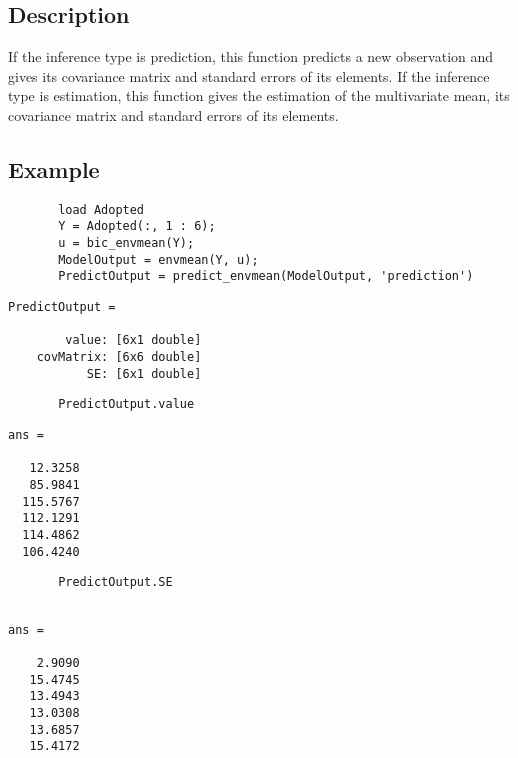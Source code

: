 \documentclass[a4paper,11pt,openany]{memoir}
\begin{document}
\subsection*{Description}

\begin{par}
If the inference type is prediction, this function predicts a new observation and gives its covariance matrix and standard errors of its elements.  If the inference type is estimation, this function gives the estimation of the multivariate mean, its covariance matrix and standard errors of its elements.
\end{par} \vspace{1em}



\subsection*{Example}


\begin{verbatim}       load Adopted
       Y = Adopted(:, 1 : 6);
       u = bic_envmean(Y);
       ModelOutput = envmean(Y, u);
       PredictOutput = predict_envmean(ModelOutput, 'prediction')\end{verbatim}
    
        \color{lightgray} \ttfamily\begin{verbatim}
PredictOutput = 

        value: [6x1 double]
    covMatrix: [6x6 double]
           SE: [6x1 double]
\end{verbatim} \rmfamily
\color{black}
\begin{verbatim}       PredictOutput.value\end{verbatim}
        \color{lightgray} \ttfamily\begin{verbatim}
ans =

   12.3258
   85.9841
  115.5767
  112.1291
  114.4862
  106.4240
\end{verbatim} \rmfamily
\color{black}

\begin{verbatim}       PredictOutput.SE\end{verbatim}
        \color{lightgray} \ttfamily\begin{verbatim}

ans =

    2.9090
   15.4745
   13.4943
   13.0308
   13.6857
   15.4172

\end{verbatim} \rmfamily
\color{black}        
\end{document}
